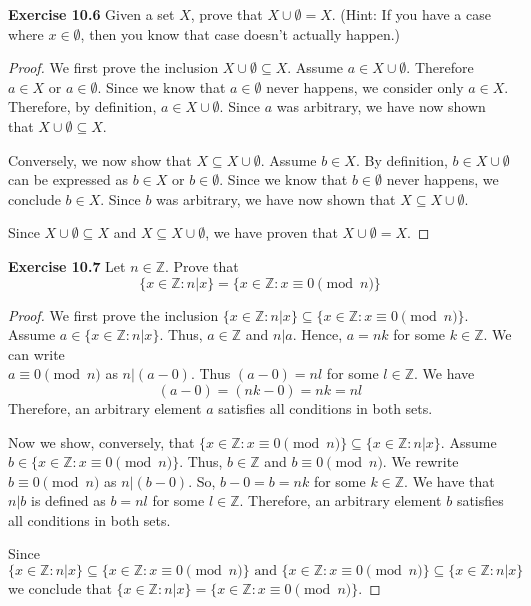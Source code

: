 \documentclass[12pt,oneside]{article}
\newenvironment{exercise}[1]{\vspace{.1in}\noindent\textbf{Exercise #1 \hspace{.05em}}}{}
\newcommand{\Z}{\mathbb{Z}}
\renewcommand{\mod}[3]{#1 \equiv #2 \pmod{#3}}
\begin{document}

\begin{exercise}{10.6}
Given a set $X$, prove that $X \cup \emptyset = X$. (Hint: If you have a case where $x \in \emptyset$, then you know that case doesn't actually happen.)
\end{exercise}

\begin{proof}
We first prove the inclusion $X \cup \emptyset \subseteq X$. Assume $a \in X \cup \emptyset$. Therefore $a \in X$ or $a \in \emptyset$. Since we know that $a \in \emptyset$ never happens, we consider only $a \in X$. Therefore, by definition, $a \in X \cup \emptyset$. Since $a$ was arbitrary, we have now shown that $X \cup \emptyset \subseteq X$.

Conversely, we now show that $X \subseteq X \cup \emptyset$. Assume $b \in X$. By definition, $b \in X \cup \emptyset$ can be expressed as $b \in X$ or $b \in \emptyset$. Since we know that $b \in \emptyset$ never happens, we conclude $b \in X$. Since $b$ was arbitrary, we have now shown that $X \subseteq X \cup \emptyset$.

Since $X \cup \emptyset \subseteq X$ and $X \subseteq X \cup \emptyset$, we have proven that $X \cup \emptyset = X$.
\end{proof}



\begin{exercise}{10.7}
Let $n \in \Z$. Prove that
\[\{x \in \Z:n|x\} = \{x \in \Z : \mod{x}{0}{n}\}\]
\end{exercise}

\begin{proof}
We first prove the inclusion $\{x \in \Z:n|x\} \subseteq \{x \in \Z : \mod{x}{0}{n}\}$. Assume $a \in \{x \in \Z:n|x\}$. Thus, $a \in \Z$ and $n|a$. Hence, $a = nk$ for some $k \in \Z$. We can write \\ $\mod{a}{0}{n}$ as $n|(a - 0)$. Thus $(a-0) = nl$ for some $l \in \Z$. We have 
\[(a-0) = (nk - 0) = nk = nl\] 
Therefore, an arbitrary element $a$ satisfies all conditions in both sets.

Now we show, conversely, that $\{x \in \Z : \mod{x}{0}{n}\} \subseteq \{x \in \Z:n|x\}$. Assume $b \in \{x \in \Z : \mod{x}{0}{n}\}$. Thus, $b \in \Z$ and $\mod{b}{0}{n}$. We rewrite $\mod{b}{0}{n}$ as $n|(b - 0)$. So, $b - 0 = b = nk$ for some $k \in \Z$. We have that $n|b$ is defined as $b = nl$ for some $l \in \Z$. Therefore, an arbitrary element $b$ satisfies all conditions in both sets.

Since 
\[\{x \in \Z:n|x\} \subseteq \{x \in \Z : \mod{x}{0}{n}\} \text{ and } \{x \in \Z : \mod{x}{0}{n}\} \subseteq \{x \in \Z:n|x\}\]
we conclude that $\{x \in \Z:n|x\} = \{x \in \Z : \mod{x}{0}{n}\}$.
\end{proof}
\end{document}
